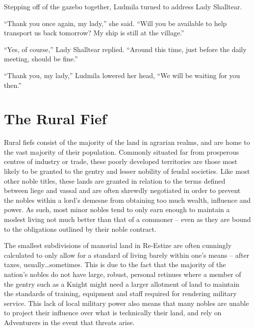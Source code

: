 Stepping off of the gazebo together, Ludmila turned to address Lady Shalltear.

 

“Thank you once again, my lady,” she said. “Will you be available to help transport us back tomorrow? My ship is still at the village.”

 

“Yes, of course,” Lady Shalltear replied. “Around this time, just before the daily meeting, should be fine.”

 

“Thank you, my lady,” Ludmila lowered her head, “We will be waiting for you then.”

\section*{The Rural Fief}

Rural fiefs consist of the majority of the land in agrarian realms, and are home to the vast majority of their population. Commonly situated far from prosperous centres of industry or trade, these poorly developed territories are those most likely to be granted to the gentry and lesser nobility of feudal societies. Like most other noble titles, these lands are granted in relation to the terms defined between liege and vassal and are often shrewdly negotiated in order to prevent the nobles within a lord’s demesne from obtaining too much wealth, influence and power. As such, most minor nobles tend to only earn enough to maintain a modest living not much better than that of a commoner – even as they are bound to the obligations outlined by their noble contract.

 

The smallest subdivisions of manorial land in Re-Estize are often cunningly calculated to only allow for a standard of living barely within one’s means – after taxes, usually…sometimes. This is due to the fact that the majority of the nation’s nobles do not have large, robust, personal retinues where a member of the gentry such as a Knight might need a larger allotment of land to maintain the standards of training, equipment and staff required for rendering military service. This lack of local military power also means that many nobles are unable to project their influence over what is technically their land, and rely on Adventurers in the event that threats arise.

 


